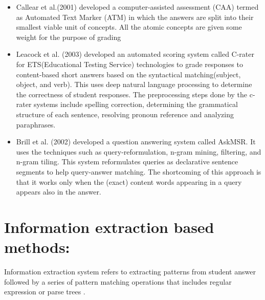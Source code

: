 \documentclass[rnd]{mas_proposal}
\begin{document}
	\begin{itemize}
	 \item Callear et al.(2001) \cite{Callear2001}	developed a  computer-assisted assessment (CAA) termed as Automated Text Marker (ATM) in which the answers are  split  into  their  smallest  viable  unit  of concepts. All the atomic concepts are given some weight for the purpose of grading

	\item Leacock et al. (2003)\cite{Leacock2003} developed an automated scoring system called C-rater for ETS(Educational Testing Service) technologies to grade responses to content-based short answers based on the syntactical matching(subject, object, and verb). This uses deep natural language processing to determine the correctness of student responses. The preprocessing steps done by the c-rater systems include spelling correction, determining the grammatical structure of each sentence, resolving pronoun reference and analyzing paraphrases.
	
	  \item Brill et al. (2002) \cite{Brill2002} developed a question answering system called AskMSR. It uses the techniques such as query-reformulation, n-gram mining, filtering, and n-gram tiling. This system reformulates queries as declarative sentence segments to help query-answer matching. The shortcoming of this approach is that it works only when the (exact) content words appearing in a query appears also in the answer.
	
\end{itemize}


\section{Information extraction based methods:}

	Information extraction system refers to 
extracting patterns from student answer followed by a series of pattern matching operations that includes regular expression or parse trees \cite{Burrows2015}.
\end{document}
